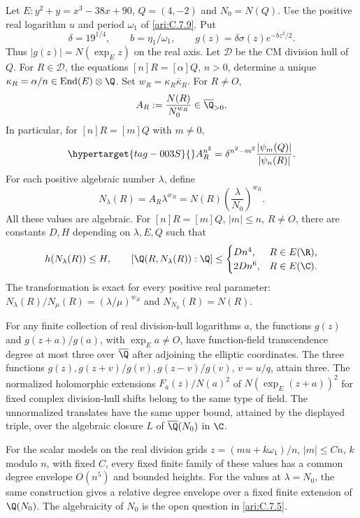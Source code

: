 \begin{proposition}\hypertarget{tag-001A}{}\label{ari:C.7.12}

Let $E:y^2+y=x^3-38x+90$, $Q=(4,-2)$ and $N_0=N(Q)$.
Use the positive real logarithm $u$ and period $\omega_1$ of
\ref{ari:C.7.9}. Put
\[
 \delta=19^{1/4},\qquad b=\eta_1/\omega_1,\qquad
 g(z)=\delta\sigma(z)e^{-bz^2/2}.
\]
Thus $|g(z)|=N(\exp_Ez)$ on the real axis. Let $\mathcal D$
be the CM division hull of $Q$. For $R\in\mathcal D$, the
equations $[n]R=[\alpha]Q$, $n>0$, determine a unique
$\kappa_R=\alpha/n\in\operatorname{End}(E)\otimes\Q$.
Set $w_R=\kappa_R\bar\kappa_R$. For $R\ne O$,
\[
 A_R:=\frac{N(R)}{N_0^{w_R}}\in\overline\Q_{>0}.
\]
In particular, for $[n]R=[m]Q$ with $m\ne0$,
\begin{equation}\hypertarget{tag-003S}{}\label{ari:eq:division-ratio-model}
 A_R^{n^2}=\delta^{n^2-m^2}
                  \frac{|\psi_m(Q)|}{|\psi_n(R)|}.
\end{equation}
For each positive algebraic number $\lambda$, define
\[
 N_\lambda(R)=A_R\lambda^{w_R}
       =N(R)\left(\frac{\lambda}{N_0}\right)^{w_R}.
\]
All these values are algebraic. For $[n]R=[m]Q$, $|m|\le n$,
$R\ne O$, there are constants $D,H$ depending on $\lambda,E,Q$
such that
\[
 h(N_\lambda(R))\le H,\qquad
 [\Q(R,N_\lambda(R)):\Q]\le
 \begin{cases}Dn^4,&R\in E(\R),\\2Dn^6,&R\in E(\C).
 \end{cases}
\]
The transformation is exact for every positive real parameter:
$N_\lambda(R)/N_\mu(R)=(\lambda/\mu)^{w_R}$ and
$N_{N_0}(R)=N(R)$.

For any finite collection of real division-hull logarithms $a$,
the functions $g(z)$ and $g(z+a)/g(a)$, with $\exp_Ea\ne O$,
have function-field transcendence degree at most three over
$\overline\Q$ after adjoining the elliptic coordinates.
The three functions $g(z),g(z+v)/g(v),g(z-v)/g(v)$, $v=u/q$,
attain three. The normalized holomorphic extensions
$F_a(z)/N(a)^2$ of $N(\exp_E(z+a))^2$ for fixed complex
division-hull shifts belong to the same type of field.
The unnormalized translates have the same upper bound, attained by
the displayed triple, over the algebraic closure $L$ of $\overline\Q(N_0)$ in $\C$.

For the scalar models on the real division grids
$z=(mu+k\omega_1)/n$, $|m|\le Cn$, $k$ modulo $n$, with
fixed $C$, every fixed finite family of these values has a common
degree envelope $O(n^5)$ and bounded heights. For the values at $\lambda=N_0$, the same construction
gives a relative degree envelope over a fixed finite extension
of $\Q(N_0)$. The algebraicity of $N_0$ is the open question in
\cref{ari:C.7.5}. 
\end{proposition}

